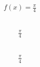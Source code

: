 \documentclass[12pt]{article}
\begin{document}
\subsection{}
\begin{align*}
f{\left(x \right)} = \frac{\pi}{4}
\end{align*}
\vspace{1cm}
\subsection{}
\begin{align*}
\frac{\pi}{4}
\end{align*}
\vspace{1cm}
\subsection{}
\begin{align*}
\frac{\pi}{4}
\end{align*}
\vspace{1cm}
\end{document}
